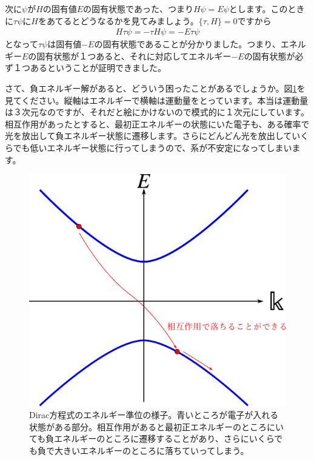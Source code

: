 \documentclass[report,paper=a4, fontsize=12pt, line_length=16cm, number_of_lines=33,dvipdfmx]{jlreq}
\numberwithin{equation}{chapter}
\begin{document}
次に$\psi$が$H$の固有値$E$の固有状態であった、つまり$H\psi=E\psi$とします。このときに$\tau \psi$に$H$をあてるとどうなるかを見てみましょう。$\{\tau,H\}=0$ですから
\begin{align}
  H\tau\psi=-\tau H\psi=-E\tau\psi
\end{align}
となって$\tau\psi$は固有値$-E$の固有状態であることが分かりました。つまり、エネルギー$E$の固有状態が１つあると、それに対応してエネルギー$-E$の固有状態が必ず１つあるということが証明できました。

さて、負エネルギー解があると、どういう困ったことがあるでしょうか。図\ref{fig:negative_energy}を見てください。縦軸はエネルギーで横軸は運動量をとっています。本当は運動量は３次元なのですが、それだと絵にかけないので模式的に１次元にしています。相互作用があったとすると、最初正エネルギーの状態にいた電子も、ある確率で光を放出して負エネルギー状態に遷移します。さらにどんどん光を放出していくらでも低いエネルギー状態に行ってしまうので、系が不安定になってしまいます。
\begin{figure}[htbp]
  \centering
  \includegraphics{negative_energy.pdf}
  \caption{Dirac方程式のエネルギー準位の様子。青いところが電子が入れる状態がある部分。相互作用があると最初正エネルギーのところにいても負エネルギーのところに遷移することがあり、さらにいくらでも負で大きいエネルギーのところに落ちていってしまう。}
  \label{fig:negative_energy}
\end{figure}
\end{document}
